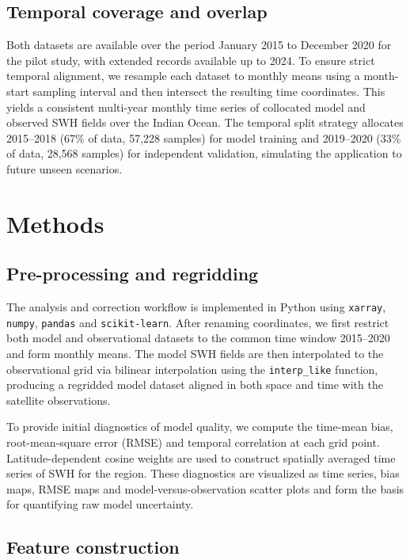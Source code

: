 \documentclass[twocolumn]{article}
\begin{document}
 \subsection{Temporal coverage and overlap}
 
 Both datasets are available over the period January 2015 to December 2020 for the pilot study, with extended records available up to 2024. To ensure strict temporal alignment, we resample each dataset to monthly means using a month-start sampling interval and then intersect the resulting time coordinates. This yields a consistent multi-year monthly time series of collocated model and observed SWH fields over the Indian Ocean. The temporal split strategy allocates 2015--2018 (67\% of data, 57,228 samples) for model training and 2019--2020 (33\% of data, 28,568 samples) for independent validation, simulating the application to future unseen scenarios.
 
 \section{Methods}
 
 \subsection{Pre-processing and regridding}
 
The analysis and correction workflow is implemented in Python using \texttt{xarray}, \texttt{numpy}, \texttt{pandas} and \texttt{scikit-learn}. After renaming coordinates, we first restrict both model and observational datasets to the common time window 2015--2020 and form monthly means. The model SWH fields are then interpolated to the observational grid via bilinear interpolation using the \texttt{interp\_like} function, producing a regridded model dataset aligned in both space and time with the satellite observations.
 
 To provide initial diagnostics of model quality, we compute the time-mean bias, root-mean-square error (RMSE) and temporal correlation at each grid point. Latitude-dependent cosine weights are used to construct spatially averaged time series of SWH for the region. These diagnostics are visualized as time series, bias maps, RMSE maps and model-versus-observation scatter plots and form the basis for quantifying raw model uncertainty.
 
 \subsection{Feature construction}
 
\end{document}
